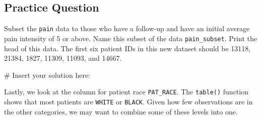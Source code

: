 \documentclass[
  letterpaper,
]{latex/krantz}
\makeatletter
\newenvironment{Shaded}{\begin{snugshade}}{\end{snugshade}}
\newcommand{\CommentTok}[1]{\textcolor[rgb]{0.37,0.37,0.37}{#1}}
\newcommand{\FunctionTok}[1]{\textcolor[rgb]{0.28,0.35,0.67}{#1}}
\newcommand{\NormalTok}[1]{\textcolor[rgb]{0.00,0.23,0.31}{#1}}
\newcommand{\SpecialCharTok}[1]{\textcolor[rgb]{0.37,0.37,0.37}{#1}}
\newenvironment{kframe}{%
\medskip{}
\setlength{\fboxsep}{.8em}
 \def\at@end@of@kframe{}%
 \ifinner\ifhmode%
  \def\at@end@of@kframe{\end{minipage}}%
  \begin{minipage}{\columnwidth}%
 \fi\fi%
 \def\FrameCommand##1{\hskip\@totalleftmargin \hskip-\fboxsep
 \colorbox{shadecolor}{##1}\hskip-\fboxsep
     \hskip-\linewidth \hskip-\@totalleftmargin \hskip\columnwidth}%
 \MakeFramed {\advance\hsize-\width
   \@totalleftmargin\z@ \linewidth\hsize
   \@setminipage}}%
 {\par\unskip\endMakeFramed%
 \at@end@of@kframe}
\renewenvironment{Shaded}{\begin{kframe}}{\end{kframe}}
\makeatother
\begin{document}
\subsection{Practice Question}\label{practice-question-5}

Subset the \texttt{pain} data to those who have a follow-up and have an
initial average pain intensity of 5 or above. Name this subset of the
data \texttt{pain\_subset}. Print the head of this data. The first six
patient IDs in this new dataset should be 13118, 21384, 1827, 11309,
11093, and 14667.

\begin{Shaded}
\begin{Highlighting}[]
\CommentTok{\# Insert your solution here:}
\end{Highlighting}
\end{Shaded}

Lastly, we look at the column for patient race \texttt{PAT\_RACE}. The
\texttt{table()} function shows that most patients are \texttt{WHITE} or
\texttt{BLACK}. Given how few observations are in the other categories,
we may want to combine some of these levels into one.

\begin{Shaded}
\end{Shaded}
\end{document}

